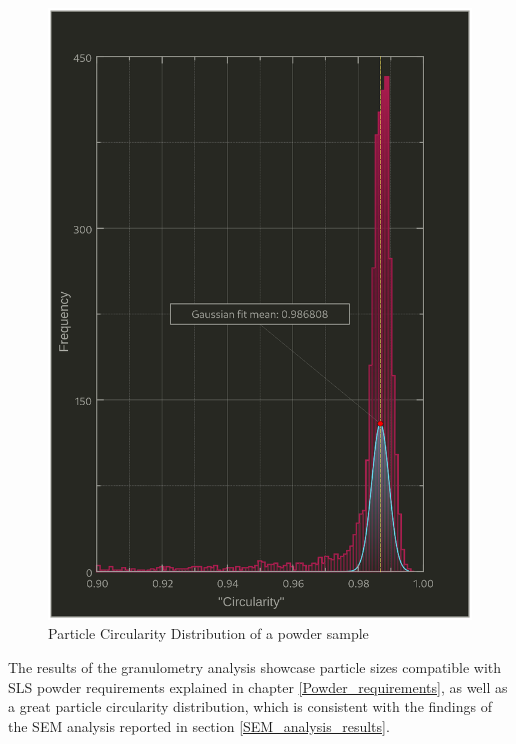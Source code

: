 \documentclass{article}
\begin{document}
        \begin{figure}[h!]
            \centering
            \includegraphics[width=\textwidth]{Pictures/Granulometry_plots/Histogram_Circularity.eps}
            \caption{Particle Circularity Distribution of a powder sample}
            \label{fig:circularity_distribution}
        \end{figure}
  
      \clearpage
  
      The results of the granulometry analysis showcase particle sizes compatible with SLS powder requirements explained in chapter \ref{Powder_requirements}, 
      as well as a great particle circularity distribution, which is consistent with the findings of the 
      SEM analysis reported in section \ref{SEM_analysis_results}. \\
  
\end{document}
